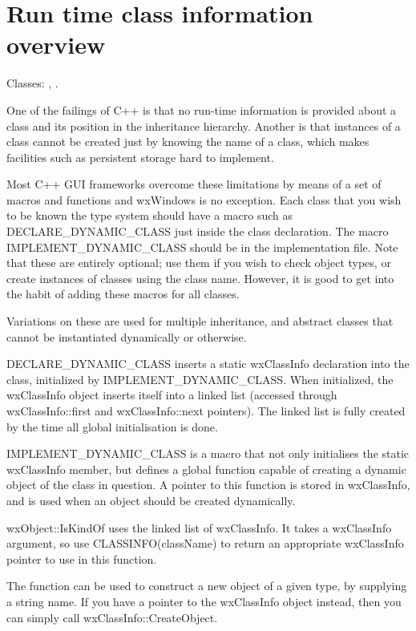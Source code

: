 \section{Run time class information overview}\label{runtimeclassoverview}

Classes: , .

One of the failings of C++ is that no run-time information is provided
about a class and its position in the inheritance hierarchy.
Another is that instances of a class cannot be created just by knowing the name of a class,
which makes facilities such as persistent storage hard to implement.

Most C++ GUI frameworks overcome these limitations by means of a set of
macros and functions and wxWindows is no exception.
Each class that you wish to be known the type system should have
a macro such as DECLARE\_DYNAMIC\_CLASS just inside the class declaration.
The macro IMPLEMENT\_DYNAMIC\_CLASS should be in the implementation file.
Note that these are entirely optional; use them if you wish to check object
types, or create instances of classes using the class name. However,
it is good to get into the habit of adding these macros for all classes.

Variations on these  are used for multiple inheritance, and abstract
classes that cannot be instantiated dynamically or otherwise.

DECLARE\_DYNAMIC\_CLASS inserts a static wxClassInfo declaration into the
class, initialized by IMPLEMENT\_DYNAMIC\_CLASS. When initialized, the
wxClassInfo object inserts itself into a linked list (accessed through
wxClassInfo::first and wxClassInfo::next pointers). The linked list
is fully created by the time all global initialisation is done.

IMPLEMENT\_DYNAMIC\_CLASS is a macro that not only initialises the static
wxClassInfo member, but defines a global function capable of creating a
dynamic object of the class in question. A pointer to this function is
stored in wxClassInfo, and is used when an object should be created
dynamically.

wxObject::IsKindOf uses the linked list of wxClassInfo. It takes
a wxClassInfo argument, so use CLASSINFO(className) to return an
appropriate wxClassInfo pointer to use in this function.

The function  can be used
to construct a new object of a given type, by supplying a string name.
If you have a pointer to the wxClassInfo object instead, then you
can simply call wxClassInfo::CreateObject.

